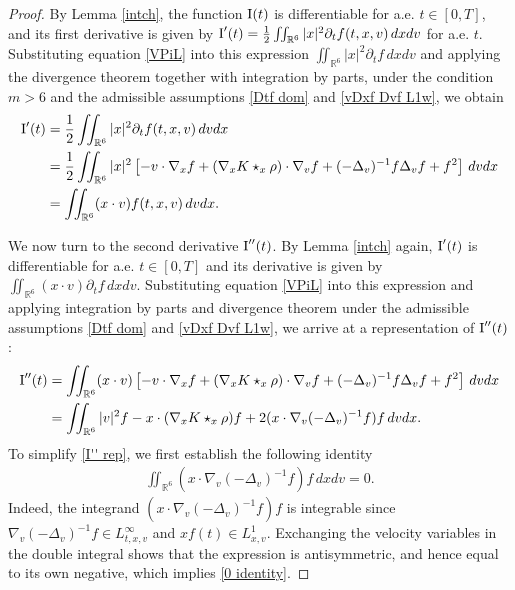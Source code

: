 \documentclass[reqno,11pt,final]{amsart}
\theoremstyle{plain}
\numberwithin{equation}{section}
\numberwithin{theorem}{section}
\begin{document}
\begin{proof}
    By Lemma \ref{intch}, the function $\textup{I}(t)$ is differentiable for a.e. $t\in[0,T]$, and its first derivative is given by $\textup{I}'(t) = \frac{1}{2}\iint_{\mathbb{R}^6} |x|^2\partial_tf(t,x,v)\,dxdv$ for a.e. $t$. Substituting equation \eqref{VPiL} into this expression $\iint_{\mathbb{R}^6} |x|^2\partial_tf\,dxdv$ and applying the divergence theorem together with integration by parts, under the condition $m>6$ and the admissible assumptions \eqref{Dtf dom} and \eqref{vDxf Dvf L1w}, we obtain
    \begin{align*}
    \begin{split}
    \textup{I}'(t)&=\frac{1}{2}\iint_{\mathbb{R}^6} |x|^2\partial_tf(t,x,v)\,dvdx\\
    &= \frac{1}{2}\iint_{\mathbb{R}^6} |x|^2 \left[-v\cdot \nabla_x f +(\nabla_xK\star_x \rho)\cdot \nabla_vf + (-\Delta_v)^{-1}f \Delta_vf+f^2\right]\,dvdx\\
    &= \iint_{\mathbb{R}^6} (x\cdot v)f(t,x,v)\,dvdx.
    \end{split}
    \end{align*}

    We now turn to the second derivative $\textup{I}''(t)$. By Lemma \ref{intch} again, $\textup{I}'(t)$ is differentiable for a.e. $t\in[0,T]$ and its derivative is given by $\iint_{\mathbb{R}^6}(x\cdot v)\partial_tf\,dxdv$. Substituting equation \eqref{VPiL} into this expression and applying integration by parts and divergence theorem under the admissible assumptions \eqref{Dtf dom} and \eqref{vDxf Dvf L1w}, we arrive at a representation of $\textup{I}''(t)$:
    \begin{align}
    \textup{I}''(t)&=\iint_{\mathbb{R}^6} (x\cdot v)\left[-v\cdot \nabla_xf+(\nabla_xK\star_x \rho)\cdot \nabla_vf+(-\Delta_v)^{-1}f\Delta_vf+f^2\right]\,dvdx\nonumber\\ 
    &=\iint_{\mathbb{R}^6} |v|^2f-x\cdot(\nabla_xK\star_x \rho)f+2(x\cdot \nabla_v(-\Delta_v)^{-1}f)f\,dvdx. \label{I'' rep}
    \end{align}To simplify \eqref{I'' rep}, we first establish the following identity
    \begin{align}\label{0 identity}
    \iint_{\mathbb{R}^6} (x\cdot\nabla_v(-\Delta_v)^{-1}f)f\,dxdv=0.
    \end{align}Indeed, the integrand $(x\cdot\nabla_v(-\Delta_v)^{-1}f)f$ is integrable since $\nabla_v(-\Delta_v)^{-1}f\in L^\infty_{t,x,v}$ and $xf(t)\in L^1_{x,v}$. Exchanging the velocity variables in the double integral shows that the expression is antisymmetric, and hence equal to its own negative, which implies \eqref{0 identity}.


\end{proof}
\end{document}
